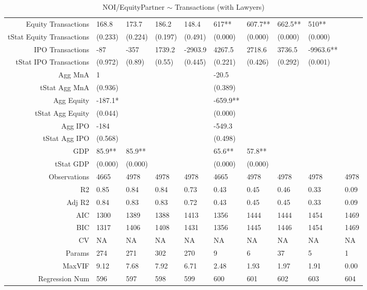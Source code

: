 \begin{table}[ht]
\begin{tabular}{rlllllllll}
  Equity Transactions & 168.8 & 173.7 & 186.2 & 148.4 & 617** & 607.7** & 662.5** & 510** &  \\ 
  tStat Equity Transactions & (0.233) & (0.224) & (0.197) & (0.491) & (0.000) & (0.000) & (0.000) & (0.000) &  \\ 
  IPO Transactions & -87 & -357 & 1739.2 & -2903.9 & 4267.5 & 2718.6 & 3736.5 & -9963.6** &  \\ 
  tStat IPO Transactions & (0.972) & (0.89) & (0.55) & (0.445) & (0.221) & (0.426) & (0.292) & (0.001) &  \\ 
  Agg MnA & 1 &  &  &  & -20.5 &  &  &  &  \\ 
  tStat Agg MnA & (0.936) &  &  &  & (0.389) &  &  &  &  \\ 
  Agg Equity & -187.1* &  &  &  & -659.9** &  &  &  &  \\ 
  tStat Agg Equity & (0.044) &  &  &  & (0.000) &  &  &  &  \\ 
  Agg IPO & -184 &  &  &  & -549.3 &  &  &  &  \\ 
  tStat Agg IPO & (0.568) &  &  &  & (0.498) &  &  &  &  \\ 
  GDP & 85.9** & 85.9** &  &  & 65.6** & 57.8** &  &  &  \\ 
  tStat GDP & (0.000) & (0.000) &  &  & (0.000) & (0.000) &  &  &  \\ 
  Observations & 4665 & 4978 & 4978 & 4978 & 4665 & 4978 & 4978 & 4978 & 4978 \\ 
  R2 & 0.85 & 0.84 & 0.84 & 0.73 & 0.43 & 0.45 & 0.46 & 0.33 & 0.09 \\ 
  Adj R2 & 0.84 & 0.83 & 0.83 & 0.72 & 0.43 & 0.45 & 0.45 & 0.33 & 0.09 \\ 
  AIC & 1300 & 1389 & 1388 & 1413 & 1356 & 1444 & 1444 & 1454 & 1469 \\ 
  BIC & 1317 & 1406 & 1408 & 1431 & 1356 & 1445 & 1446 & 1454 & 1469 \\ 
  CV & NA & NA & NA & NA & NA & NA & NA & NA & NA \\ 
  Params & 274 & 271 & 302 & 270 & 9 & 6 & 37 & 5 & 1 \\ 
  MaxVIF & 9.12 & 7.68 & 7.92 & 6.71 & 2.48 & 1.93 & 1.97 & 1.91 & 0.00 \\ 
  Regression Num & 596 & 597 & 598 & 599 & 600 & 601 & 602 & 603 & 604 \\ 
   \hline
\end{tabular}
\caption{NOI/EquityPartner $\sim$ Transactions (with Lawyers)} 
\end{table}
